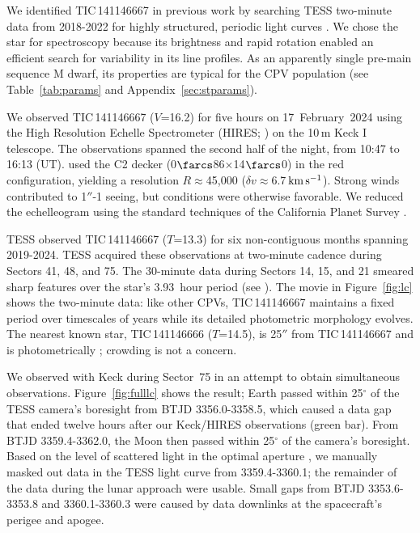 \documentclass[11pt,twocolumn,tighten]{aastex7}
\newcommand{\kms}{\ensuremath{\rm km\,s^{-1}}}
\begin{document}
We identified TIC\,141146667 in previous work \citep{Bouma2024} by
searching TESS two-minute data from 2018-2022 for highly structured,
periodic light curves \citep{Ricker2015}.  We chose the star for
spectroscopy because its brightness and rapid rotation enabled an
efficient search for variability in its line profiles.  As an
apparently single pre-main sequence M dwarf, its properties are
typical for the CPV population (see Table~\ref{tab:params} and
Appendix~\ref{sec:stparams}).

We observed TIC\,141146667 ($V$=16.2) for five hours on
17~February~2024 using the High Resolution Echelle Spectrometer
(HIRES; \citealt{vogt_hires_1994}) on the 10\,m Keck I telescope.  The
observations spanned the second half of the night, from 10:47 to 16:13
(UT).   used the C2
decker (0$\farcs$86$\times$14$\farcs$0) in the red configuration,
yielding a resolution $R$$\approx$45{,}000 ($\delta
v$$\approx$6.7\,\kms).  Strong winds contributed to 1$''$-1
seeing, but conditions were otherwise favorable.  We reduced the
echelleogram using the standard techniques of the California Planet
Survey \citep{Howard2010}.  

TESS observed TIC\,141146667 ($T$=13.3) for six non-contiguous months
spanning 2019-2024.  TESS acquired these observations at two-minute
cadence during Sectors 41, 48, and 75.   The 30-minute data during
Sectors 14, 15, and 21 smeared sharp features over the star's
3.93~hour period (see \citealt{Gunther2022}).  The movie in
Figure~\ref{fig:lc} shows the two-minute data: like other CPVs,
TIC\,141146667 maintains a fixed period over timescales of years while
its detailed photometric morphology evolves.  The nearest known star,
TIC\,141146666 ($T$=14.5), is 25$''$ from TIC\,141146667 and is
photometrically ; crowding is not a concern.

We observed with Keck during Sector~75 in an attempt to obtain
simultaneous observations.   Figure~\ref{fig:fulllc} shows the result;
Earth passed within 25$^\circ$ of the TESS camera's boresight from
BTJD 3356.0-3358.5, which caused a data gap that ended twelve hours
after our Keck/HIRES observations (green bar).  From BTJD
3359.4-3362.0, the Moon then passed within 25$^\circ$ of the camera's
boresight.  Based on the level of scattered light in the optimal
aperture \citep{Jenkins2016}, we manually masked out data in the TESS
light curve from 3359.4-3360.1; the remainder of the data during the
lunar approach were usable.  Small gaps from BTJD 3353.6-3353.8 and
3360.1-3360.3 were caused by data downlinks at the spacecraft's
perigee and apogee.
\end{document}
